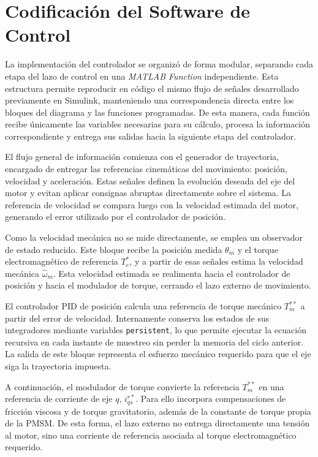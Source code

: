 \documentclass[12pt, a4paper,journal, onecolumn, compsoc]{IEEEtran}
\begin{document}
\section{Codificación del Software de Control}

La implementación del controlador se organizó de forma modular, separando cada etapa del lazo de control en una \textit{MATLAB Function} independiente. Esta estructura permite reproducir en código el mismo flujo de señales desarrollado previamente en Simulink, manteniendo una correspondencia directa entre los bloques del diagrama y las funciones programadas. De esta manera, cada función recibe únicamente las variables necesarias para su cálculo, procesa la información correspondiente y entrega sus salidas hacia la siguiente etapa del controlador.

El flujo general de información comienza con el generador de trayectoria, encargado de entregar las referencias cinemáticas del movimiento: posición, velocidad y aceleración. Estas señales definen la evolución deseada del eje del motor y evitan aplicar consignas abruptas directamente sobre el sistema. La referencia de velocidad se compara luego con la velocidad estimada del motor, generando el error utilizado por el controlador de posición.

Como la velocidad mecánica no se mide directamente, se emplea un observador de estado reducido. Este bloque recibe la posición medida $\theta_m$ y el torque electromagnético de referencia $T_e^{*}$, y a partir de esas señales estima la velocidad mecánica $\hat{\omega}_m$. Esta velocidad estimada se realimenta hacia el controlador de posición y hacia el modulador de torque, cerrando el lazo externo de movimiento.

El controlador PID de posición calcula una referencia de torque mecánico $T_m^{**}$ a partir del error de velocidad. Internamente conserva los estados de sus integradores mediante variables \texttt{persistent}, lo que permite ejecutar la ecuación recursiva en cada instante de muestreo sin perder la memoria del ciclo anterior. La salida de este bloque representa el esfuerzo mecánico requerido para que el eje siga la trayectoria impuesta.

A continuación, el modulador de torque convierte la referencia $T_m^{**}$ en una referencia de corriente de eje $q$, $i_{qs}^{r*}$. Para ello incorpora compensaciones de fricción viscosa y de torque gravitatorio, además de la constante de torque propia de la PMSM. De esta forma, el lazo externo no entrega directamente una tensión al motor, sino una corriente de referencia asociada al torque electromagnético requerido.
\end{document}
